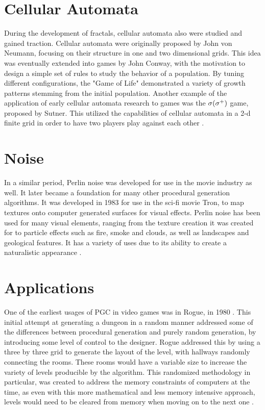 \documentclass[10pt]{report}
\begin{document}
		\section{Cellular Automata}
		
		During the development of fractals, cellular automata also were studied and gained traction. Cellular automata were originally proposed by John von Neumann, focusing on their structure in one and two dimensional grids. This idea was eventually extended into games by John Conway, with the motivation to design a simple set of rules to study the behavior of a population. By tuning different configurations, the "Game of Life" demonstrated a variety of growth patterns stemming from the initial population. Another example of the application of early cellular automata research to games was the \(\sigma(\sigma\textsuperscript{+})\) game, proposed by Sutner. This utilized the capabilities of cellular automata in a 2-d finite grid in order to have two players play against each other \cite{10.1145/349194.349202}.
		
		\section{Noise}
		
		In a similar period, Perlin noise was developed for use in the movie industry as well. It later became a foundation for many other procedural generation algorithms. It was developed in 1983 for use in the sci-fi movie Tron, to map textures onto computer generated surfaces for visual effects. Perlin noise has been used for many visual elements, ranging from the texture creation it was created for to particle effects such as fire, smoke and clouds, as well as landscapes and geological features. It has a variety of uses due to its ability to create a naturalistic appearance \cite{10.1145/325165.325247}.
		
		\section{Applications}
		One of the earliest usages of PGC in video games was in Rogue, in 1980 \cite{rogue}. This initial attempt at generating a dungeon in a random manner addressed some of the differences between procedural generation and purely random generation, by introducing some level of control to the designer. Rogue addressed this by using a three by three grid to generate the layout of the level, with hallways randomly connecting the rooms. These rooms would have a variable size to increase the variety of levels producible by the algorithm. This randomized methodology in particular, was created to address the memory constraints of computers at the time, as even with this more mathematical and less memory intensive approach, levels would need to be cleared from memory when moving on to the next one \cite{rogue}.
		
\end{document}
